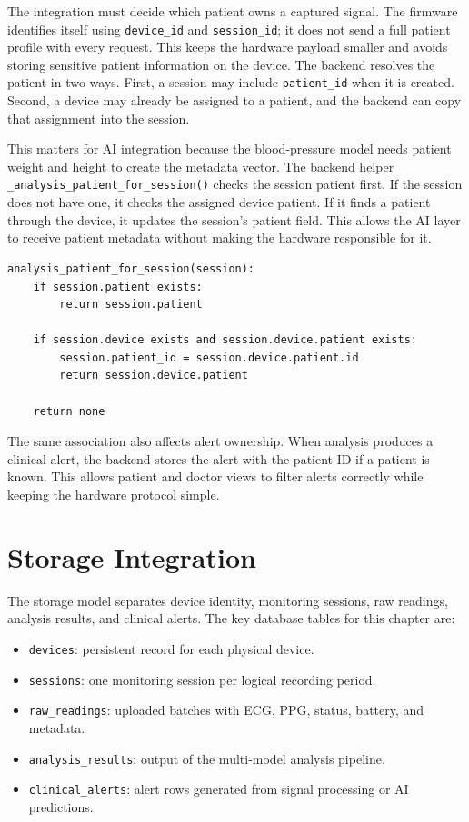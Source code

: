 The integration must decide which patient owns a captured signal. The firmware identifies itself using \texttt{device\_id} and \texttt{session\_id}; it does not send a full patient profile with every request. This keeps the hardware payload smaller and avoids storing sensitive patient information on the device. The backend resolves the patient in two ways. First, a session may include \texttt{patient\_id} when it is created. Second, a device may already be assigned to a patient, and the backend can copy that assignment into the session.

This matters for AI integration because the blood-pressure model needs patient weight and height to create the metadata vector. The backend helper \texttt{\_analysis\_patient\_for\_session()} checks the session patient first. If the session does not have one, it checks the assigned device patient. If it finds a patient through the device, it updates the session's patient field. This allows the AI layer to receive patient metadata without making the hardware responsible for it.

\begin{lstlisting}[caption={Pseudocode for resolving the patient used during analysis}]
analysis_patient_for_session(session):
    if session.patient exists:
        return session.patient

    if session.device exists and session.device.patient exists:
        session.patient_id = session.device.patient.id
        return session.device.patient

    return none
\end{lstlisting}

The same association also affects alert ownership. When analysis produces a clinical alert, the backend stores the alert with the patient ID if a patient is known. This allows patient and doctor views to filter alerts correctly while keeping the hardware protocol simple.

\section{Storage Integration}

The storage model separates device identity, monitoring sessions, raw readings, analysis results, and clinical alerts. The key database tables for this chapter are:

\begin{itemize}
    \item \texttt{devices}: persistent record for each physical device.
    \item \texttt{sessions}: one monitoring session per logical recording period.
    \item \texttt{raw\_readings}: uploaded batches with ECG, PPG, status, battery, and metadata.
    \item \texttt{analysis\_results}: output of the multi-model analysis pipeline.
    \item \texttt{clinical\_alerts}: alert rows generated from signal processing or AI predictions.
\end{itemize}

